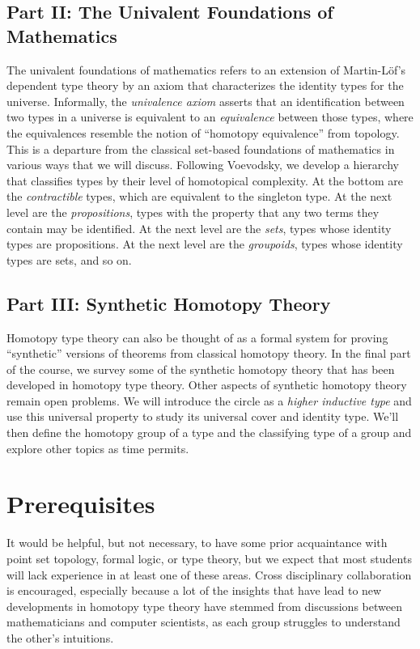 \documentclass{amsart}
\theoremstyle{definition}
\theoremstyle{remark}
\numberwithin{equation}{section}
\begin{document}
\subsection*{Part II: The Univalent Foundations of Mathematics}

The univalent foundations of mathematics refers to an extension of Martin-L\"{o}f's dependent type theory by an axiom that characterizes the identity types for the universe. Informally, the \emph{univalence axiom} asserts that an identification between two types in a universe is equivalent to an \emph{equivalence} between those types, where the equivalences resemble the notion of ``homotopy equivalence'' from topology. This is a departure from the classical set-based foundations of mathematics in various ways that we will discuss. Following Voevodsky, we develop a hierarchy that classifies types by their level of homotopical complexity. At the bottom are the \emph{contractible} types, which are equivalent to the singleton type. At the next level are the \emph{propositions}, types with the property that any two terms they contain may be identified. At the next level are the \emph{sets}, types whose identity types are propositions. At the next level are the \emph{groupoids}, types whose identity types are sets, and so on.

\subsection*{Part III: Synthetic Homotopy Theory}

Homotopy type theory can also be thought of as a formal system for proving ``synthetic'' versions of theorems from classical homotopy theory. In the final part of the course, we survey some of the synthetic homotopy theory that has been developed in homotopy type theory. Other aspects of synthetic homotopy theory remain open problems. We will introduce the circle as a \emph{higher inductive type} and use this universal property to study its universal cover and identity type.  We'll then define the homotopy group of a type and the classifying type of a group and explore other topics as time permits.

\section*{Prerequisites} 

It would be helpful, but not necessary, to have some prior acquaintance with point set topology, formal logic, or type theory, but we expect that most students will lack experience in at least one of these areas. Cross disciplinary collaboration is encouraged, especially because a lot of the insights that have lead to new developments in homotopy type theory have stemmed from discussions between mathematicians and computer scientists, as each group struggles to understand the other's intuitions.
\end{document}
